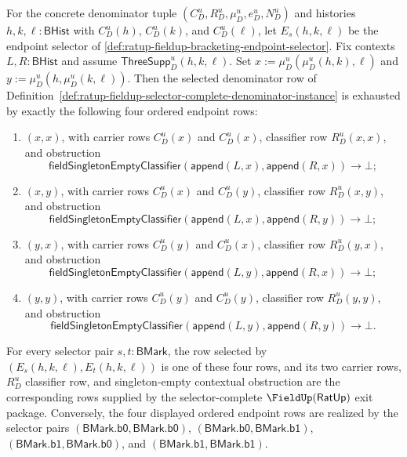 \begin{theorem}
\label{thm:ratup-fieldup-selector-complete-denominator-row-exhaustion}
For the concrete denominator tuple $(C_D^u,R_D^u,\mu_D^u,e_D^u,N_D^u)$ and
histories $h,k,\ell:\mathsf{BHist}$ with $C_D^u(h)$, $C_D^u(k)$, and
$C_D^u(\ell)$, let $E_s(h,k,\ell)$ be the endpoint selector of
\autoref{def:ratup-fieldup-bracketing-endpoint-selector}. Fix contexts
$L,R:\mathsf{BHist}$ and assume $\mathsf{ThreeSupp}_D^u(h,k,\ell)$. Set
$x:=\mu_D^u(\mu_D^u(h,k),\ell)$ and
$y:=\mu_D^u(h,\mu_D^u(k,\ell))$. Then the selected denominator row of
Definition~\ref{def:ratup-fieldup-selector-complete-denominator-instance} is
exhausted by exactly the following four ordered endpoint rows:
\begin{enumerate}
  \item $(x,x)$, with carrier rows $C_D^u(x)$ and $C_D^u(x)$, classifier row
  $R_D^u(x,x)$, and obstruction
  $$
  \mathsf{fieldSingletonEmptyClassifier}
  (\mathsf{append}(L,x),\mathsf{append}(R,x))\to\bot;
  $$
  \item $(x,y)$, with carrier rows $C_D^u(x)$ and $C_D^u(y)$, classifier row
  $R_D^u(x,y)$, and obstruction
  $$
  \mathsf{fieldSingletonEmptyClassifier}
  (\mathsf{append}(L,x),\mathsf{append}(R,y))\to\bot;
  $$
  \item $(y,x)$, with carrier rows $C_D^u(y)$ and $C_D^u(x)$, classifier row
  $R_D^u(y,x)$, and obstruction
  $$
  \mathsf{fieldSingletonEmptyClassifier}
  (\mathsf{append}(L,y),\mathsf{append}(R,x))\to\bot;
  $$
  \item $(y,y)$, with carrier rows $C_D^u(y)$ and $C_D^u(y)$, classifier row
  $R_D^u(y,y)$, and obstruction
  $$
  \mathsf{fieldSingletonEmptyClassifier}
  (\mathsf{append}(L,y),\mathsf{append}(R,y))\to\bot.
  $$
\end{enumerate}
For every selector pair $s,t:\mathsf{BMark}$, the row selected by
$(E_s(h,k,\ell),E_t(h,k,\ell))$ is one of these four rows, and its two carrier
rows, $R_D^u$ classifier row, and singleton-empty contextual obstruction are
the corresponding rows supplied by the selector-complete $\FieldUp(\mathsf{RatUp})$
exit package. Conversely, the four displayed ordered endpoint rows are realized
by the selector pairs $(\mathsf{BMark.b0},\mathsf{BMark.b0})$,
$(\mathsf{BMark.b0},\mathsf{BMark.b1})$,
$(\mathsf{BMark.b1},\mathsf{BMark.b0})$, and
$(\mathsf{BMark.b1},\mathsf{BMark.b1})$.
\end{theorem}
